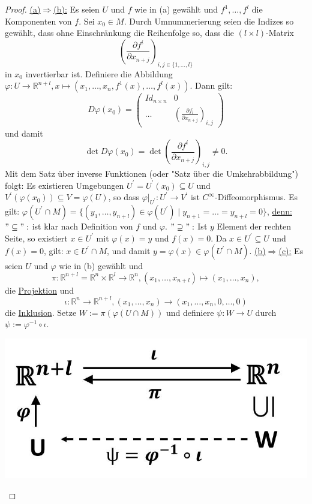 \documentclass[a4paper,11pt,notitlepage]{report}
\theoremstyle{definition}
\newcommand{\R}{{\ensuremath{\mathbb{R}}}}
\begin{document}
\begin{proof}
		\underline{(a)$\Rightarrow$(b):} Es seien $U$ und $f$ wie in (a) gewählt und $f^1, \ldots, f^l$ die Komponenten von $f$. Sei $x_0 \in M$. Durch Umnummerierung seien die Indizes so gewählt, dass ohne Einschränkung die Reihenfolge so, dass die $(l \times l)$-Matrix 
		$$\left(\frac{\partial f^i}{\partial x_{n+j}}\right)_{i,j \in \{1, \ldots, l\}}$$
		in $x_0$ invertierbar ist.
		Definiere die Abbildung $\varphi \colon U \rightarrow \R^{n+l}, x \mapsto (x_1, \ldots, x_n, f^1(x), \ldots, f^l(x))$.
		Dann gilt:
		\[
		D \varphi(x_0) = 
		\left( 
		\begin{array}{c|c} 
			Id_{n \times n} &   0  \\ \hline
			\hdots             &   \left(\frac{\partial f_i}{\partial x_{n+j}}\right)_{i,j}
		\end{array}
		\right)
		\] 
		und damit 
		$$\det{D \varphi(x_0)} = \det{\left(\frac{\partial f^i}{\partial x_{n+j}}\right)_{i,j}} \neq 0.$$
		Mit dem Satz über inverse Funktionen (oder "Satz über die Umkehrabbildung") folgt:
		Es existieren Umgebungen $U^\prime = U^\prime(x_0) \subseteq U$ und $V^\prime(\varphi(x_0)) \subseteq V = \varphi(U)$, so dass
		$\varphi \big |_{U^\prime} \colon U^\prime \rightarrow V^\prime$ ist $C^\infty$-Diffeomorphismus.
		\newline
		Es gilt: $\varphi(U^\prime \cap M) = \{(y_1, \ldots, y_{n+l}) \in \varphi(U^\prime) \mid y_{n+1} = \ldots = y_{n+l}=0\}$,
		\underline{denn:} \newline $"\subseteq":$ ist klar nach Definition von $f$ und $\varphi$.
		\newline
		$"\supseteq":$ Ist $y$ Element der rechten Seite, so existiert $x \in U^\prime$ mit $\varphi(x)=y$ und $f(x)=0$. Da $x \in U^\prime \subseteq U$ und $f(x)=0$, gilt: $x \in U^\prime \cap M$, und damit $y = \varphi(x) \in \varphi(U^\prime \cap M)$.
		\newline
		 \underline{(b)$\Rightarrow$(c):} Es seien $U$ und $\varphi$ wie in (b) gewählt und
		 $$\pi \colon \R^{n+l} = \R^n \times \R^l \rightarrow \R^n, (x_1, \ldots, x_{n+l}) \mapsto (x_1, \ldots, x_n),$$
		 die \underline{Projektion} und
		 $$\iota \colon \R^n \rightarrow \R^{n+l}, (x_1, \ldots, x_n) \rightarrow (x_1, \ldots, x_n, 0, \ldots, 0)$$ die \underline{Inklusion}.
		 \newline
		 Setze $W := \pi(\varphi(U \cap M))$ und definiere $\psi \colon W \rightarrow U$ durch $\psi := \varphi^{-1} \circ \iota$.
\begin{center}
	\includegraphics[scale=0.5]{images/Beweis_Satz_UMF_Diagramm.jpg}

\end{center}
\end{proof}
\end{document}
